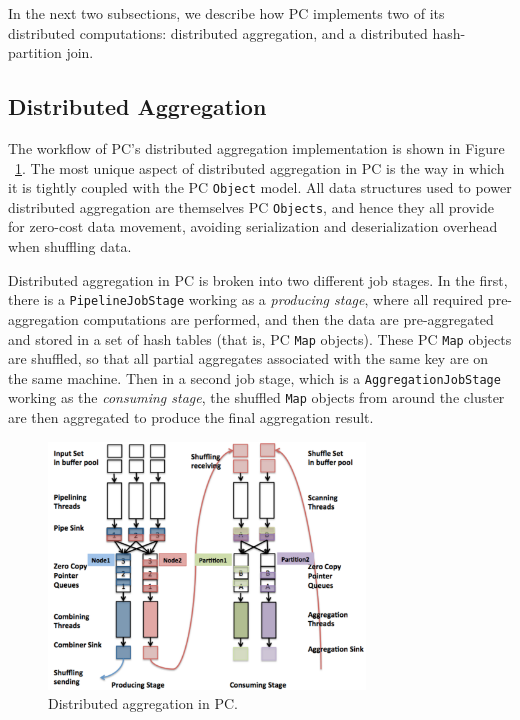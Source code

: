 In the next two subsections, we describe how PC implements two of its distributed computations: distributed aggregation, and a distributed hash-partition join.

\subsection{Distributed Aggregation}

The workflow of PC's distributed aggregation implementation is
shown in Figure ~\ref{fig:aggregation}.
The most unique aspect of distributed aggregation in PC is the way in which it is tightly coupled with the PC \texttt{Object} model.  All data structures used
to power distributed aggregation are themselves PC \texttt{Objects}, and hence they all provide for zero-cost data movement, avoiding
serialization and deserialization overhead when shuffling data.

Distributed aggregation in PC is broken into two different job stages.
In the first, there is a \texttt{PipelineJobStage} working as a \emph{producing stage},
where all required pre-aggregation computations are performed, and then the
data are pre-aggregated and stored in a set of hash tables (that is, PC \texttt{Map} objects).  These PC \texttt{Map} objects are shuffled, so that all partial aggregates
associated with the same key are on the same machine.  Then in a
second job stage, which is a \texttt{AggregationJobStage} working as the \emph{consuming stage},
the shuffled \texttt{Map} objects from around the cluster are then aggregated
to produce the final aggregation result.

\begin{figure}
\centering
\includegraphics[width=0.75\textwidth]{aggregation.pdf}
  \caption{\label{fig:aggregation} Distributed aggregation in PC.}
\end{figure}

